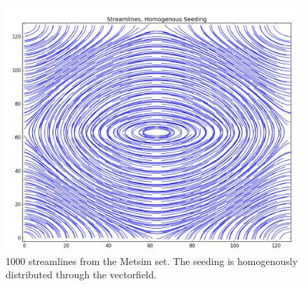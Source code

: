 \documentclass[a4paper,10pt]{report}
\begin{document}
\begin{figure}\centering
 \includegraphics[width=0.9\linewidth]{homo}
 \caption{1000 streamlines from the Metsim set. The seeding is homogenously distributed through the vectorfield.}
 \label{fig1}
\end{figure}
\end{document}
